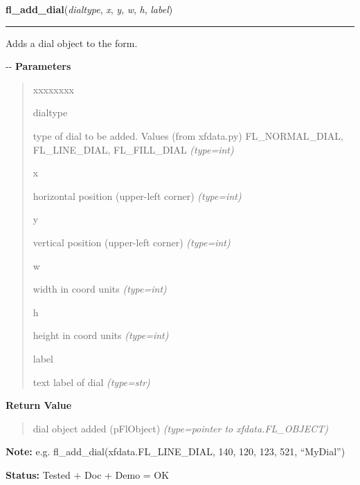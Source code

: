     \vspace{0.5ex}

\hspace{.8\funcindent}\begin{boxedminipage}{\funcwidth}

    \raggedright \textbf{fl\_add\_dial}(\textit{dialtype}, \textit{x}, \textit{y}, \textit{w}, \textit{h}, \textit{label})

    \vspace{-1.5ex}

    \rule{\textwidth}{0.5\fboxrule}
\setlength{\parskip}{2ex}

Adds a dial object to the form.

-{}-
\setlength{\parskip}{1ex}
      \textbf{Parameters}
      \vspace{-1ex}

      \begin{quote}
        \begin{Ventry}{xxxxxxxx}

          \item[dialtype]


type of dial to be added. Values (from xfdata.py) FL\_NORMAL\_DIAL,
FL\_LINE\_DIAL, FL\_FILL\_DIAL
            {\it (type=int)}

          \item[x]


horizontal position (upper-left corner)
            {\it (type=int)}

          \item[y]


vertical position (upper-left corner)
            {\it (type=int)}

          \item[w]


width in coord units
            {\it (type=int)}

          \item[h]


height in coord units
            {\it (type=int)}

          \item[label]


text label of dial
            {\it (type=str)}

        \end{Ventry}

      \end{quote}

      \textbf{Return Value}
    \vspace{-1ex}

      \begin{quote}

dial object added (pFlObject)
      {\it (type=pointer to xfdata.FL\_OBJECT)}

      \end{quote}

\textbf{Note:} 
e.g. fl\_add\_dial(xfdata.FL\_LINE\_DIAL, 140, 120, 123, 521, ``MyDial'')


\textbf{Status:} 
Tested + Doc + Demo = OK


    \end{boxedminipage}

